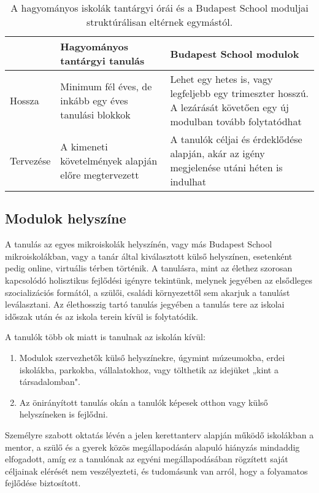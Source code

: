 \begin{table}[h]
\centering
\begin{tabular}{@{}p{1.5cm}|p{4cm}|p{4cm}@{}}

& \textbf{Hagyományos tantárgyi tanulás}  & \textbf{ Budapest School modulok}
\\ \hline
   Hossza &
   Minimum fél éves, de inkább egy éves tanulási blokkok &
   Lehet egy hetes is, vagy legfeljebb egy trimeszter hosszú. A lezárását követően egy új modulban tovább folytatódhat \\ \hline
Tervezése & A kimeneti követelmények alapján előre megtervezett &
 A tanulók céljai és érdeklődése alapján, akár az igény megjelenése utáni héten is indulhat\\ \hline

\end{tabular}
\caption{A hagyományos iskolák tantárgyi órái és a Budapest School moduljai struktúrálisan eltérnek egymástól.}

\label{tanorak-vs-modulok}

\end{table}



\subsection{ Modulok helyszíne}

A tanulás az egyes mikroiskolák helyszínén, vagy más Budapest School mikroiskolákban, vagy a tanár által kiválasztott külső helyszínen, esetenként pedig online, virtuális térben történik. A tanulásra, mint az élethez szorosan kapcsolódó holisztikus fejlődési igényre tekintünk, melynek jegyében az elsődleges szocializációs formától, a szülői, családi környezettől sem akarjuk a tanulást leválasztani. Az élethosszig tartó tanulás jegyében a tanulás tere az iskolai időszak után és az iskola terein kívül is folytatódik.

A tanulók több ok miatt is tanulnak az iskolán kívül:
\begin{enumerate}
\item Modulok szervezhetők külső helyszínekre, úgymint múzeumokba, erdei iskolákba, parkokba, vállalatokhoz, vagy tölthetik az idejüket „kint a társadalomban".

\item Az önirányított tanulás okán a tanulók képesek otthon vagy külső helyszíneken is fejlődni.
\end{enumerate}
Személyre szabott oktatás lévén a jelen kerettanterv alapján működő iskolákban a mentor, a szülő és a gyerek közös megállapodásán alapuló hiányzás mindaddig elfogadott, amíg ez a tanulónak az  egyéni megállapodásában rögzített saját céljainak elérését nem veszélyezteti, és tudomásunk van arról, hogy a folyamatos fejlődése biztosított.



